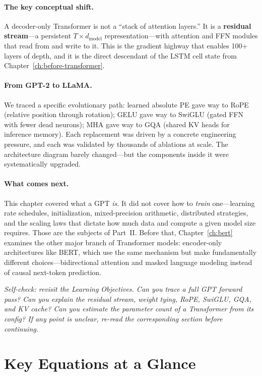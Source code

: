 \paragraph{The key conceptual shift.} A decoder-only Transformer is not a ``stack of attention layers.'' It is a \textbf{residual stream}---a persistent $T \times d_\text{model}$ representation---with attention and FFN modules that read from and write to it. This is the gradient highway that enables 100+ layers of depth, and it is the direct descendant of the LSTM cell state from Chapter~\ref{ch:before-transformer}.

\paragraph{From GPT-2 to LLaMA.} We traced a specific evolutionary path: learned absolute PE gave way to RoPE (relative position through rotation); GELU gave way to SwiGLU (gated FFN with fewer dead neurons); MHA gave way to GQA (shared KV heads for inference memory). Each replacement was driven by a concrete engineering pressure, and each was validated by thousands of ablations at scale. The architecture diagram barely changed---but the components inside it were systematically upgraded.

\paragraph{What comes next.} This chapter covered what a GPT \emph{is}. It did not cover how to \emph{train} one---learning rate schedules, initialization, mixed-precision arithmetic, distributed strategies, and the scaling laws that dictate how much data and compute a given model size requires. Those are the subjects of Part~II. Before that, Chapter~\ref{ch:bert} examines the other major branch of Transformer models: encoder-only architectures like BERT, which use the same mechanism but make fundamentally different choices---bidirectional attention and masked language modeling instead of causal next-token prediction.

\medskip
\noindent\textit{Self-check: revisit the Learning Objectives. Can you trace a full GPT forward pass? Can you explain the residual stream, weight tying, RoPE, SwiGLU, GQA, and KV cache? Can you estimate the parameter count of a Transformer from its config? If any point is unclear, re-read the corresponding section before continuing.}


\section*{Key Equations at a Glance}

